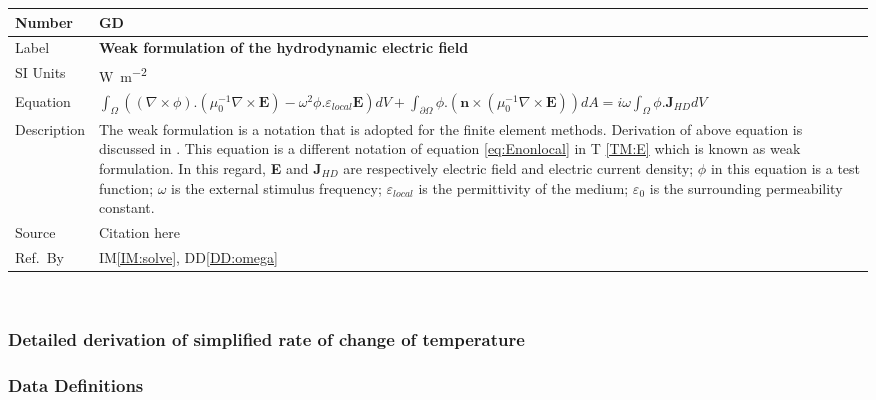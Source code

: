 \documentclass[12pt]{article}
\newcommand{\colBwidth}{0.82\textwidth} \newcommand{\colCwidth}{0.1\textwidth}
\newcounter{defnum} %
\begin{document}
	\noindent \begin{minipage}{\textwidth} \renewcommand*{\arraystretch}{1.5}
		\begin{tabular}{| p{\colAwidth} | p{\colBwidth}|} \hline \rowcolor[gray]{0.9}
			Number& GD{defnum}\thedefnum \label{GD:weakE}\\ \hline Label &\bf
			Weak formulation of the hydrodynamic electric field \\ \hline %
			SI Units&\si{\watt\per\square\metre}\\ \hline Equation& $\int_\Omega ((\nabla
			\times \phi) . (\mu^{-1}_0 \nabla \times \textbf{E})-\omega^2
			\phi.\varepsilon_{local} \textbf{E}) dV + \int_{\partial \Omega} \phi.(\textbf{n}
			\times (\mu^{-1}_0 \nabla \times \textbf{E}))dA = i\omega \int_\Omega \phi.
			\textbf{J}_{HD} dV $ \\ \hline Description & The weak formulation is a notation
			that is adopted for the finite element methods. Derivation of above equation is
			discussed in \cite{hiremath2012numerical}. This equation is a different notation
			of equation \ref{eq:Enonlocal} in T \ref{TM:E} which is known as weak formulation.  In this regard, \textbf{E} and \textbf{J}$_{HD}$ are respectively electric field and electric current density; $\phi$ in this equation is a test function; $\omega$ is the external stimulus frequency; $\varepsilon_{local}$ is the permittivity of the medium; $\varepsilon_{0}$ is the surrounding permeability constant. \  \\ \hline
			Source & Citation here \\ \hline Ref.\ By & IM\ref{IM:solve},
			DD\ref{DD:omega}\\ \hline \end{tabular} \end{minipage}\\
	
	\subsubsection*{Detailed derivation of simplified rate of change of temperature}
	
	
	
	\subsubsection{Data Definitions}\label{sec_datadef}
	
\end{document}
